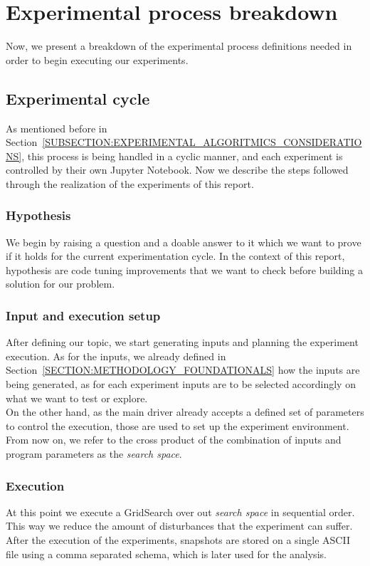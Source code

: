 \section{Experimental process breakdown}
Now, we present a breakdown of the experimental process definitions needed in order to begin executing our experiments.\\

\subsection{Experimental cycle}
As mentioned before in Section~\ref{SUBSECTION:EXPERIMENTAL_ALGORITMICS_CONSIDERATIONS}, this process is being handled in a cyclic manner, and each experiment is controlled by their own Jupyter Notebook. Now we describe the steps followed through the realization of the experiments of this report.\\

\subsubsection{Hypothesis}
We begin by raising a question and a doable answer to it which we want to prove if it holds for the current experimentation cycle. In the context of this report, hypothesis are code tuning improvements that we want to check before building a solution for our problem.\\

\subsubsection{Input and execution setup}
After defining our topic, we start generating inputs and planning the experiment execution. As for the inputs, we already defined in Section~\ref{SECTION:METHODOLOGY_FOUNDATIONALS} how the inputs are being generated, as for each experiment inputs are to be selected accordingly on what we want to test or explore. \\

On the other hand, as the main driver already accepts a defined set of parameters to control the execution, those are used to set up the experiment environment. From now on, we refer to the cross product of the combination of inputs and program parameters as the \textit{search space}.\\

\subsubsection{Execution}
At this point we execute a GridSearch over out \textit{search space} in sequential order. This way we reduce the amount of disturbances that the experiment can suffer. After the execution of the experiments, snapshots are stored on a single ASCII file using a comma separated schema, which is later used for the analysis.\\

